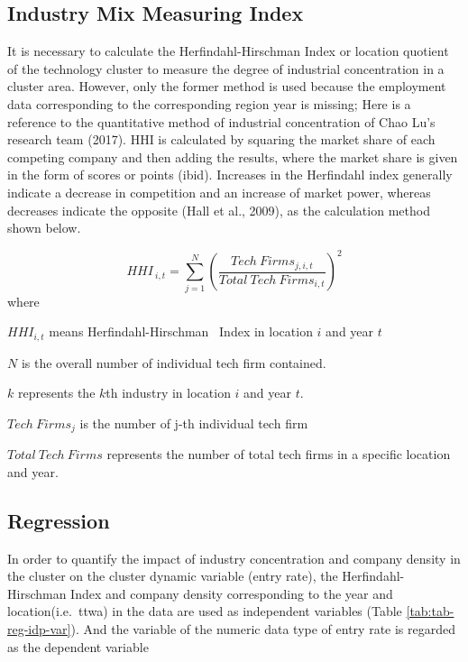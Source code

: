 \documentclass[
  12pt,
  oneside]{book}
\begin{document}
\hypertarget{industry-mix-measuring-index}{%
\subsection{Industry Mix Measuring Index}\label{industry-mix-measuring-index}}

It is necessary to calculate the Herfindahl-Hirschman Index or location quotient of the technology cluster to measure the degree of industrial concentration in a cluster area. However, only the former method is used because the employment data corresponding to the corresponding region year is missing; Here is a reference to the quantitative method of industrial concentration of Chao Lu's research team (2017). HHI is calculated by squaring the market share of each competing company and then adding the results, where the market share is given in the form of scores or points (ibid). Increases in the Herfindahl index generally indicate a decrease in competition and an increase of market power, whereas decreases indicate the opposite (Hall et al., 2009), as the calculation method shown below.

\[
HHI_{\ i,t} = \sum_{j=1}^N (\frac{Tech\ Firms_{j,i,t}}{Total\ Tech\ Firms_{i,t}})^2 
\]
where

\(HHI_{i,t}\) means Herfindahl-Hirschman ~Index in location \(i\) and year \(t\)

\(N\) is the overall number of individual tech firm contained.

\(k\) represents the \(k\)th industry in location \(i\) and year \(t\).

\(Tech\ Firms_j\) is the number of j-th individual tech firm

\(Total\ Tech\ Firms\) represents the number of total tech firms in a specific location and year.

\hypertarget{regression}{%
\subsection{Regression}\label{regression}}

In order to quantify the impact of industry concentration and company density in the cluster on the cluster dynamic variable (entry rate), the Herfindahl-Hirschman Index and company density corresponding to the year and location(i.e.~ttwa) in the data are used as independent variables (Table \ref{tab:tab-reg-idp-var}). And the variable of the numeric data type of entry rate is regarded as the dependent variable
\end{document}
